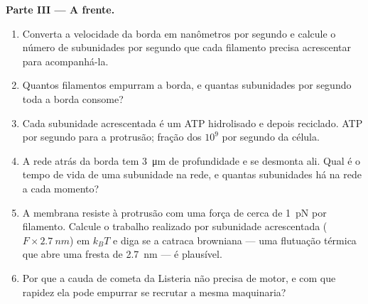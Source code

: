 \begin{problem}
\medskip
\noindent\textbf{Parte III --- A frente.}
\begin{enumerate}[resume]
  \item Converta a velocidade da borda em nanômetros por segundo e
        calcule o número de subunidades por segundo que cada filamento
        precisa acrescentar para acompanhá-la.
  \item Quantos filamentos empurram a borda, e quantas subunidades por
        segundo toda a borda consome?
  \item Cada subunidade acrescentada é um ATP hidrolisado e depois
        reciclado. ATP por segundo para a protrusão; fração dos
        $10^{9}$ por segundo da célula.
  \item A rede atrás da borda tem \qty{3}{\micro m} de profundidade e
        se desmonta ali. Qual é o tempo de vida de uma subunidade na
        rede, e quantas subunidades há na rede a cada momento?
  \item A membrana resiste à protrusão com uma força de cerca de
        \qty{1}{pN} por filamento. Calcule o trabalho realizado por
        subunidade acrescentada ($F\times \qty{2.7}{nm}$) em $k_{B}T$ e
        diga se a catraca browniana --- uma flutuação térmica que abre
        uma fresta de \qty{2.7}{nm} --- é plausível.
  \item Por que a cauda de cometa da Listeria não precisa de
        motor, e com que rapidez ela pode empurrar se recrutar a mesma
        maquinaria?
\end{enumerate}


\end{problem}
